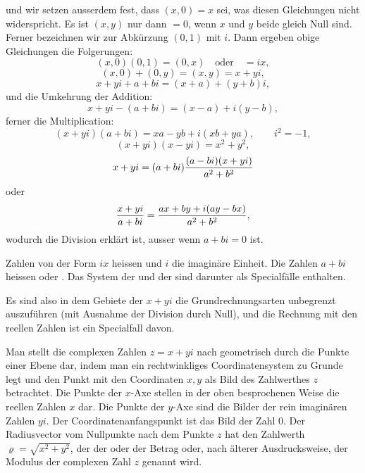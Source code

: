 \begingroup
\setlength{\abovedisplayskip}{5pt plus 2pt minus 1pt}
\setlength{\belowdisplayskip}{5pt plus 2pt minus 1pt}
\setlength{\abovedisplayshortskip}{3pt plus 1pt}
\setlength{\belowdisplayshortskip}{4pt plus 1pt}
und wir setzen ausserdem fest, dass $(x,0)=x$ sei, was diesen
Gleichungen nicht widerspricht. Es ist $(x,y)$ nur dann $=0$, wenn $x$
und $y$ beide gleich Null sind. Ferner bezeichnen wir zur Abkürzung
$(0,1)$ mit $i$. Dann ergeben obige Gleichungen die Folgerungen:
\[
 (x,0)(0,1)=(0,x)\quad\text{oder}\quad =ix,
\]
\[
 (x,0)+(0,y)=(x,y)=x+yi,
\]
\[
 x+yi+a+bi=(x+a)+(y+b)i,
\]
und die Umkehrung der Addition:
\[
 x+yi-(a+bi)=(x-a)+i(y-b),
\]
ferner die Multiplication:
\[
 (x+yi)(a+bi)=xa-yb+i(xb+ya),
 \qquad i^2=-1,
\]
\[
 (x+yi)(x-yi)=x^2+y^2,
\]
\[
 x+yi=(a+bi){(a-bi)(x+yi)\over a^2+b^2}
\]
oder
\[
 {x+yi\over a+bi}={ax+by+i(ay-bx)\over a^2+b^2},
\]
wodurch die Division erklärt ist, ausser wenn $a+bi=0$ ist.

Zahlen von der Form $ix$ heissen  und
$i$ die imaginäre Einheit. Die Zahlen $a+bi$ heissen
 oder . Das System der
 und der  sind
darunter als Specialfälle enthalten.

Es sind also in dem Gebiete der  $x+yi$ die
Grundrechnungsarten unbegrenzt auszuführen (mit Ausnahme der Division
durch Null), und die Rechnung mit den reellen Zahlen ist ein
Specialfall davon.

Man stellt die complexen Zahlen $z=x+yi$ nach 
geometrisch durch die Punkte einer Ebene dar, indem man ein
rechtwinkliges Coordinatensystem zu Grunde legt und den Punkt mit den
Coordinaten $x,y$ als Bild des Zahlwerthes $z$ betrachtet. Die Punkte
der $x$-Axe stellen in der oben besprochenen Weise die reellen Zahlen
$x$ dar. Die Punkte der $y$-Axe sind die Bilder der rein imaginären
Zahlen $yi$. Der Coordinatenanfangspunkt ist das Bild der Zahl $0$.
Der Radiusvector vom Nullpunkte nach dem Punkte $z$ hat den Zahlwerth
$\varrho=\sqrt{x^2+y^2}$, der der  oder der
Betrag oder, nach älterer Ausdrucksweise, der Modulus der complexen
Zahl $z$ genannt wird.
\endgroup

